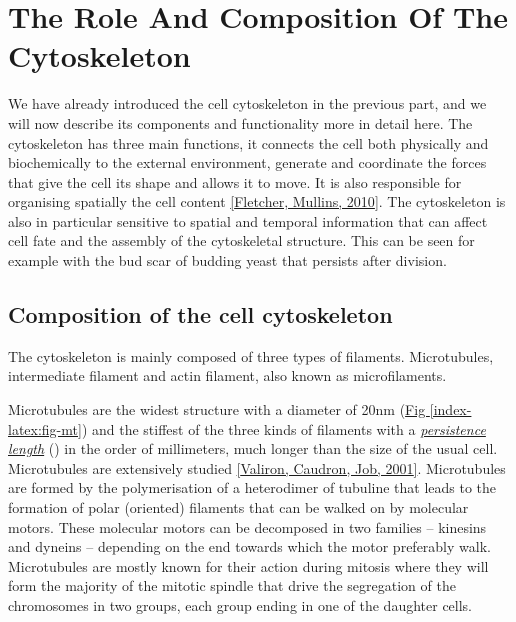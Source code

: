 \documentclass[A4paperpaper,11pt,english]{sphinxmanual}
\begin{document}
\section{The Role And Composition Of The Cytoskeleton}
\label{index-latex:the-role-and-composition-of-the-cytoskeleton}\label{index-latex:role-of-actin}
We have already introduced the cell cytoskeleton in the previous part, and we will now
describe its components and functionality more in detail here.  The cytoskeleton
has three main functions, it connects the cell both physically
and biochemically to the external environment, generate and coordinate the
forces that give the cell its shape and allows it to move. It is also
responsible for organising spatially  the cell content {\hyperref[index-latex:fletcher2010]{{[}Fletcher, Mullins,  2010{]}}}.
The cytoskeleton is also in particular sensitive to spatial and temporal
information that can affect cell fate and the assembly of the cytoskeletal
structure. This can be seen for example with the bud scar of budding yeast that
persists after division.


\subsection{Composition of the cell cytoskeleton}
\label{index-latex:composition-of-the-cell-cytoskeleton}
The cytoskeleton is mainly composed of three types of filaments.
Microtubules, intermediate filament and actin filament, also known as
microfilaments.

Microtubules are the widest structure with a diameter of 20nm (\hyperref[index-latex:fig-mt]{Fig  \ref*{index-latex:fig-mt}})
and the
stiffest of the three kinds of filaments with a {\hyperref[index-latex:viscoelastic]{\emph{persistence length}}} () in the order
of millimeters, much longer than the size of the usual cell.
Microtubules are extensively studied {\hyperref[index-latex:valiron2001]{{[}Valiron, Caudron, Job,  2001{]}}}.
Microtubules are formed by the polymerisation of a heterodimer of tubuline
that leads to the formation of polar (oriented) filaments that can be walked on
by molecular motors. These molecular motors can be decomposed in two families –
kinesins and dyneins – depending on the end towards which the motor preferably
walk.  Microtubules are mostly known for their action during mitosis
where they will form the majority of the mitotic spindle that drive the segregation
of the chromosomes in two groups, each group ending in one of the daughter
cells.
\end{document}
